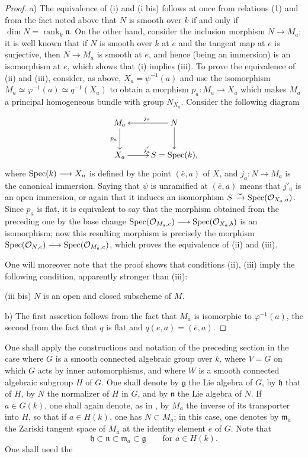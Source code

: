\begin{proof}
a) The equivalence of (i) and (i bis) follows at once from relations (1) and
from the fact noted above that $N$ is smooth over $k$ if and only if
$\dim N=\operatorname{rank}_k\mathfrak n$. On the other hand, consider the
inclusion morphism $N\to M_a$; it is well known that if $N$ is smooth over $k$ at
$e$ and the tangent map at $e$ is surjective, then $N\to M_a$ is smooth at
$e$, and hence (being an immersion) is an isomorphism at $e$, which shows
that (i) implies (iii). To prove the equivalence of (ii) and (iii), consider,
as above, $X_a=\psi^{-1}(a)$ and use the isomorphism
$M_a\simeq\varphi^{-1}(a)\simeq q^{-1}(X_a)$ to obtain a morphism
$p_a:M_a\to X_a$ which makes $M_a$ a principal homogeneous bundle with group
$N_{X_a}$. Consider the following diagram
\[
\xymatrix{
 M_a\ar[d]_{p_a}&N\ar[l]_{j_a}\ar[d]\\
 X_a\ar[r]^{j'_a}&S=\Spec(k),
}
\]
where $\operatorname{Spec}(k)\longrightarrow X_n$ is defined by the point $(\bar e,a)$ of $X$, and
$j_a:N\to M_a$ is the canonical immersion. Saying that $\psi$ is unramified
at $(\bar e,a)$ means that $j'_a$ is an open immersion, or again that it
induces an isomorphism $S\xrightarrow{\sim}\operatorname{Spec}(\mathcal{O}_{X_a,a})$. Since $p_a$ is flat,
it is equivalent to say that the morphism obtained from the preceding one
by the base change $\operatorname{Spec}(\mathcal{O}_{M_a,e})\longrightarrow\operatorname{Spec}(\mathcal{O}_{X_a,b})$ is an
isomorphism; now this resulting morphism is precisely the morphism
$\operatorname{Spec}(\mathcal{O}_{N,e})\longrightarrow\operatorname{Spec}(\mathcal{O}_{M_a,e})$, which proves the equivalence of
(ii) and (iii).

One will moreover note that the proof shows that conditions (ii), (iii)
imply the following condition, apparently stronger than (iii):

\noindent (iii bis) $N$ is an open and closed subscheme of $M$.

\noindent b) The first assertion follows from the fact that $M_a$ is
isomorphic to $\varphi^{-1}(a)$, the second from the fact that $q$ is flat
and $q(e,a)=(\bar e,a)$.
\end{proof}

One shall apply the constructions and notation of the preceding section
in the case where $G$ is a smooth connected algebraic group over $k$,
where $V=G$ on which $G$ acts by inner automorphisms, and where $W$ is a
smooth connected algebraic subgroup $H$ of $G$. One shall denote by
$\mathfrak g$ the Lie algebra of $G$, by $\mathfrak h$ that of $H$, by $N$
the normalizer of $H$ in $G$, and by $\mathfrak n$ the Lie algebra of $N$.
If $a\in G(k)$, one shall again denote, as in , by $M_a$ the inverse
of its transporter into $H$, so that if $a\in H(k)$, one has $N\subset M_a$;
in this case, one denotes by $\mathfrak m_a$ the Zariski tangent space of
$M_a$ at the identity element $e$ of $G$. Note that
\[
 \mathfrak h\subset\mathfrak n\subset\mathfrak m_a\subset\mathfrak g
 \qquad\text{for }a\in H(k).
\]
One shall need the

